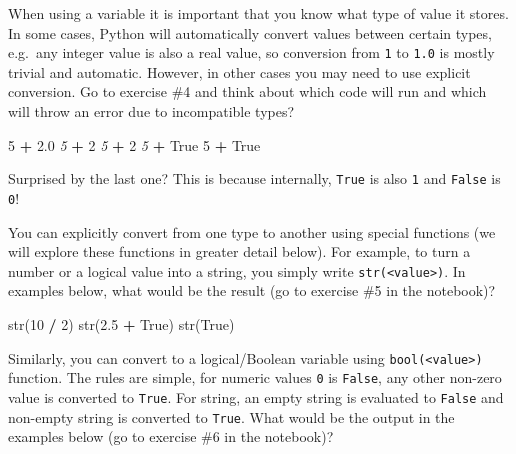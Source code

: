 \documentclass[
]{book}
\newenvironment{Shaded}{\begin{snugshade}}{\end{snugshade}}
\newcommand{\BuiltInTok}[1]{#1}
\newcommand{\CommentTok}[1]{\textcolor[rgb]{0.56,0.35,0.01}{\textit{#1}}}
\newcommand{\DecValTok}[1]{\textcolor[rgb]{0.00,0.00,0.81}{#1}}
\newcommand{\FloatTok}[1]{\textcolor[rgb]{0.00,0.00,0.81}{#1}}
\newcommand{\NormalTok}[1]{#1}
\newcommand{\OperatorTok}[1]{\textcolor[rgb]{0.81,0.36,0.00}{\textbf{#1}}}
\newcommand{\StringTok}[1]{\textcolor[rgb]{0.31,0.60,0.02}{#1}}
\newcommand{\VariableTok}[1]{\textcolor[rgb]{0.00,0.00,0.00}{#1}}
\begin{document}
When using a variable it is important that you know what type of value it stores. In some cases, Python will automatically convert values between certain types, e.g.~any integer value is also a real value, so conversion from \texttt{1} to \texttt{1.0} is mostly trivial and automatic. However, in other cases you may need to use explicit conversion. Go to exercise \#4 and think about which code will run and which will throw an error due to incompatible types?

\begin{Shaded}
\begin{Highlighting}[]
\DecValTok{5} \OperatorTok{+} \FloatTok{2.0}
\CommentTok{\textquotesingle{}5\textquotesingle{}} \OperatorTok{+} \DecValTok{2}
\CommentTok{\textquotesingle{}5\textquotesingle{}} \OperatorTok{+} \StringTok{\textquotesingle{}2\textquotesingle{}}
\CommentTok{\textquotesingle{}5\textquotesingle{}} \OperatorTok{+} \VariableTok{True}
\DecValTok{5} \OperatorTok{+} \VariableTok{True}
\end{Highlighting}
\end{Shaded}

Surprised by the last one? This is because internally, \texttt{True} is also \texttt{1} and \texttt{False} is \texttt{0}!

You can explicitly convert from one type to another using special functions (we will explore these functions in greater detail below). For example, to turn a number or a logical value into a string, you simply write \texttt{str(\textless{}value\textgreater{})}. In examples below, what would be the result (go to exercise \#5 in the notebook)?

\begin{Shaded}
\begin{Highlighting}[]
\BuiltInTok{str}\NormalTok{(}\DecValTok{10} \OperatorTok{/} \DecValTok{2}\NormalTok{)}
\BuiltInTok{str}\NormalTok{(}\FloatTok{2.5} \OperatorTok{+} \VariableTok{True}\NormalTok{)}
\BuiltInTok{str}\NormalTok{(}\VariableTok{True}\NormalTok{)}
\end{Highlighting}
\end{Shaded}

Similarly, you can convert to a logical/Boolean variable using \texttt{bool(\textless{}value\textgreater{})} function. The rules are simple, for numeric values \texttt{0} is \texttt{False}, any other non-zero value is converted to \texttt{True}. For string, an empty string \texttt{\textquotesingle{}\textquotesingle{}} is evaluated to \texttt{False} and non-empty string is converted to \texttt{True}. What would be the output in the examples below (go to exercise \#6 in the notebook)?
\end{document}
